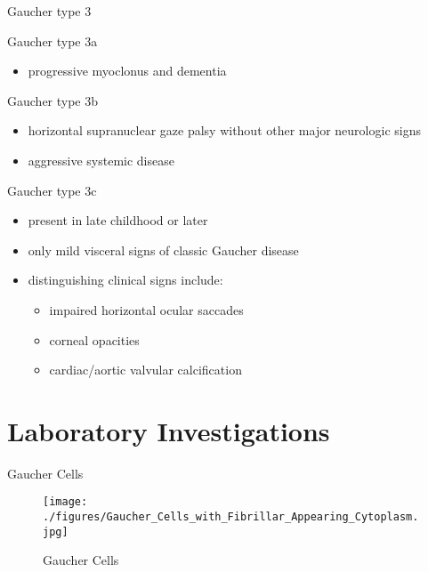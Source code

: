 \documentclass[presentation, smaller]{beamer}
\begin{document}
\begin{frame}[label={sec:orgheadline12}]{Gaucher type 3}
\begin{block}{Gaucher type 3a}
\begin{itemize}
\item progressive myoclonus and dementia
\end{itemize}
\end{block}

\begin{block}{Gaucher type 3b}
\begin{itemize}
\item horizontal supranuclear gaze palsy without other major
neurologic signs
\item aggressive systemic disease
\end{itemize}
\end{block}

\begin{block}{Gaucher type 3c}
\begin{itemize}
\item present in late childhood or later
\item only mild visceral signs of classic Gaucher disease
\item distinguishing clinical signs include:
\begin{itemize}
\item impaired horizontal ocular saccades
\item corneal opacities
\item cardiac/aortic valvular calcification
\end{itemize}
\end{itemize}
\end{block}
\end{frame}

\section{Laboratory Investigations}
\label{sec:orgheadline17}
\begin{frame}[label={sec:orgheadline14}]{Gaucher Cells}
\begin{figure}[htb]
\centering
\texttt{[image: ./figures/Gaucher\_Cells\_with\_Fibrillar\_Appearing\_Cytoplasm.jpg]}
\caption[cells]{\label{fig:cells}
Gaucher Cells}
\end{figure}
\end{frame}
\end{document}
